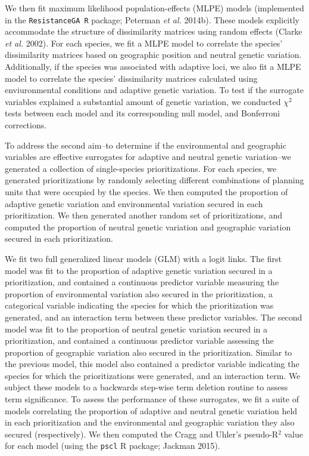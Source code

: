\documentclass[11pt,]{article}
\begin{document}
We then fit maximum likelihood population-effects (MLPE) models
(implemented in the \texttt{ResistanceGA R} package; Peterman \emph{et
al.} 2014b). These models explicitly accommodate the structure of
dissimilarity matrices using random effects (Clarke \emph{et al.} 2002).
For each species, we fit a MLPE model to correlate the species'
dissimilarity matrices based on geographic position and neutral genetic
variation. Additionally, if the species was associated with adaptive
loci, we also fit a MLPE model to correlate the species' dissimilarity
matrices calculated using enviuronmental conditions and adaptive genetic
variation. To test if the surrogate variables explained a substantial
amount of genetic variation, we conducted \(\chi^2\) tests between each
model and its corresponding null model, and Bonferroni corrections.

To address the second aim--to determine if the environmental and
geographic variables are effective surrogates for adaptive and neutral
genetic variation--we generated a collection of single-species
prioritizations. For each species, we generated prioritizations by
randomly selecting different combinations of planning units that were
occupied by the species. We then computed the proportion of adaptive
genetic variation and environmental variation secured in each
prioritization. We then generated another random set of prioritizations,
and computed the proportion of neutral genetic variation and geographic
variation secured in each prioritization.

We fit two full generalized linear models (GLM) with a logit links. The
first model was fit to the proportion of adaptive genetic variation
secured in a prioritization, and contained a continuous predictor
variable measuring the proportion of environmental variation also
secured in the prioritization, a categorical variable indicating the
species for which the prioritization was generated, and an interaction
term between these predictor variables. The second model was fit to the
proportion of neutral genetic variation secured in a prioritization, and
contained a continuous predictor variable assessing the proportion of
geographic variation also secured in the prioritization. Similar to the
previous model, this model also contained a predictor variable
indicating the species for which the prioritizations were generated, and
an interaction term. We subject these models to a backwards step-wise
term deletion routine to assess term significance. To assess the
performance of these surrogates, we fit a suite of models correlating
the proportion of adaptive and neutral genetic variation held in each
prioritization and the environmental and geographic variation they also
secured (respectively). We then computed the Cragg and Uhler's
pseudo-R\(^2\) value for each model (using the \texttt{pscl} R package;
Jackman 2015).
\end{document}
